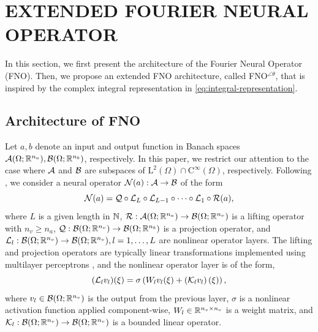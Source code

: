 \documentclass[letterpaper, 10 pt, conference]{ieeeconf}  %
\begin{document}
\section{EXTENDED FOURIER NEURAL OPERATOR}
In this section, we first present the architecture of the Fourier Neural Operator (FNO). Then, we propose an extended FNO architecture, called FNO$^{\angle \theta}$, that is inspired by the complex integral representation in \eqref{eq:integral-representation}.

\subsection{Architecture of FNO}

Let $a,b$ denote an input and output function in Banach spaces $\mathcal A(\Omega; \mathbb{R}^{n_a}), \mathcal B(\Omega; \mathbb{R}^{n_b})$, respectively. 
In this paper, we restrict our attention to the case where $\mathcal A$ and $\mathcal B$ are subspaces of $\text{L}^2(\Omega)\cap\text{C}^\infty(\Omega)$, respectively.
Following \cite{li2020fourier,duruisseaux2025fourier}, we consider a neural operator $\mathcal N(a): \mathcal A \to \mathcal B$ of the form
\begin{equation}\label{eq:neural-operator}
   \mathcal N(a)= \mathcal Q \circ \mathcal L_L \circ \mathcal L_{L-1} \circ \cdots \circ \mathcal L_1 \circ \mathcal R(a),
\end{equation}
where $L$ is a given length in $\mathbb{N}$, $\mathcal R: \mathcal A(\Omega; \mathbb{R}^{n_a}) \to \mathcal B(\Omega; \mathbb{R}^{n_v})$ is a lifting operator with $n_v \geq n_a$,
$\mathcal Q: \mathcal B(\Omega; \mathbb{R}^{n_v}) \to \mathcal B(\Omega; \mathbb{R}^{n_b})$ is a projection operator,
and $\mathcal L_l: \mathcal B(\Omega; \mathbb{R}^{n_v}) \to \mathcal B(\Omega; \mathbb{R}^{n_v}), l=1,\ldots,L$ are nonlinear operator layers. 
The lifting and projection operators are typically linear transformations implemented using multilayer perceptrons \cite{duruisseaux2025fourier}, and the nonlinear operator layer is of the form,
\begin{equation}\label{eq:FNO-layer}
   (\mathcal L_lv_l)(\xi) = \sigma\left(W_l v_l(\xi) + \left(\mathcal K_l v_l\right)(\xi)\right),
\end{equation}
where $v_l\in \mathcal B(\Omega; \mathbb{R}^{n_v})$ is the output from the previous layer, $\sigma$ is a nonlinear activation function applied component-wise, $W_l \in \mathbb{R}^{n_v \times n_v}$ is a weight matrix, and $\mathcal K_l:\mathcal B(\Omega; \mathbb{R}^{n_v}) \to \mathcal B(\Omega; \mathbb{R}^{n_v})$ is a bounded linear operator.
\end{document}
